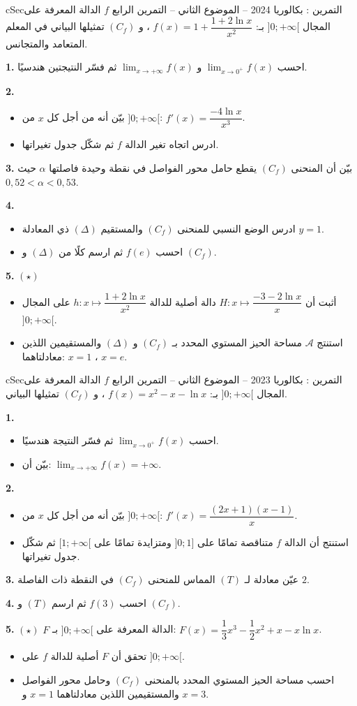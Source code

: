 \documentclass[12pt,a4paper]{article}
\newenvironment{BOX}[2]{\begin{otherlanguage}{english}\begin{arbox}{#1}{#2}}{\end{arbox}\end{otherlanguage}}
\newcounter{exo}
\newenvironment{tamrin}[1]{\stepcounter{exo}\begin{BOX}{cSec}{التمرين \theexo: #1}}{\end{BOX}}
\newenvironment{sq}{\begin{itemize}[leftmargin=2.4em,itemsep=3pt]}{\end{itemize}}
\newcommand{\qa}{\item[(أ)]}\newcommand{\qb}{\item[(ب)]}\newcommand{\qc}{\item[(جـ)]}\newcommand{\qd}{\item[(د)]}\newcommand{\qe}{\item[(هـ)]}
\newcommand{\QQ}[1]{\par\smallskip\textbf{#1.} }
\newcommand{\Lm}[1]{\displaystyle\lim_{x\to#1}}
\begin{document}
\begin{tamrin}{بكالوريا 2024 -- الموضوع الثاني -- التمرين الرابع}
$f$ الدالة المعرفة على المجال $]0;+\infty[$ بـ: $f(x)=1+\dfrac{1+2\ln x}{x^2}$ ، و $(C_f)$ تمثيلها البياني في المعلم المتعامد والمتجانس.
\QQ{1} احسب $\Lm{0^+}f(x)$ و $\Lm{+\infty}f(x)$ ثم فسّر النتيجتين هندسيًا.
\QQ{2}
\begin{sq}
\qa بيّن أنه من أجل كل $x$ من $]0;+\infty[$: $f'(x)=\dfrac{-4\ln x}{x^3}$.
\qb ادرس اتجاه تغير الدالة $f$ ثم شكّل جدول تغيراتها.
\end{sq}
\QQ{3} بيّن أن المنحنى $(C_f)$ يقطع حامل محور الفواصل في نقطة وحيدة فاصلتها $\alpha$ حيث $0{,}52<\alpha<0{,}53$.
\QQ{4}
\begin{sq}
\qa ادرس الوضع النسبي للمنحنى $(C_f)$ والمستقيم $(\Delta)$ ذي المعادلة $y=1$.
\qb احسب $f(e)$ ثم ارسم كلًا من $(\Delta)$ و $(C_f)$.
\end{sq}
\QQ{5} $(\star)$
\begin{sq}
\qa أثبت أن $H:x\mapsto\dfrac{-3-2\ln x}x$ دالة أصلية للدالة $h:x\mapsto\dfrac{1+2\ln x}{x^2}$ على المجال $]0;+\infty[$.
\qb استنتج $\mathcal A$ مساحة الحيز المستوي المحدد بـ $(C_f)$ و $(\Delta)$ والمستقيمين اللذين معادلتاهما: $x=1$ ، $x=e$.
\end{sq}
\end{tamrin}

\begin{tamrin}{بكالوريا 2023 -- الموضوع الثاني -- التمرين الرابع}
$f$ الدالة المعرفة على المجال $]0;+\infty[$ بـ: $f(x)=x^2-x-\ln x$ ، و $(C_f)$ تمثيلها البياني.
\QQ{1}
\begin{sq}
\qa احسب $\Lm{0^+}f(x)$ ثم فسّر النتيجة هندسيًا.
\qb بيّن أن: $\Lm{+\infty}f(x)=+\infty$.
\end{sq}
\QQ{2}
\begin{sq}
\qa بيّن أنه من أجل كل $x$ من $]0;+\infty[$: $f'(x)=\dfrac{(2x+1)(x-1)}x$.
\qb استنتج أن الدالة $f$ متناقصة تمامًا على $]0;1]$ ومتزايدة تمامًا على $[1;+\infty[$ ثم شكّل جدول تغيراتها.
\end{sq}
\QQ{3} عيّن معادلة لـ $(T)$ المماس للمنحنى $(C_f)$ في النقطة ذات الفاصلة $2$.
\QQ{4} احسب $f(3)$ ثم ارسم $(T)$ و $(C_f)$.
\QQ{5} $(\star)$ $F$ الدالة المعرفة على $]0;+\infty[$ بـ: $F(x)=\dfrac13x^3-\dfrac12x^2+x-x\ln x$.
\begin{sq}
\qa تحقق أن $F$ أصلية للدالة $f$ على $]0;+\infty[$.
\qb احسب مساحة الحيز المستوي المحدد بالمنحنى $(C_f)$ وحامل محور الفواصل والمستقيمين اللذين معادلتاهما $x=1$ و $x=3$.
\end{sq}
\end{tamrin}
\end{document}
